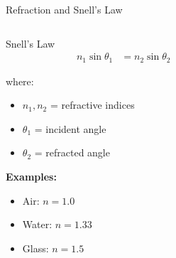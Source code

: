 \begin{frame}{Refraction and Snell's Law}
    \begin{columns}
        \begin{column}{0.5\textwidth}
            \begin{mathbox}{Snell's Law}
                \begin{align}
                    n_1 \sin\theta_1 &= n_2 \sin\theta_2
                \end{align}
                
                where:
                \begin{itemize}
                    \item $n_1, n_2$ = refractive indices
                    \item $\theta_1$ = incident angle
                    \item $\theta_2$ = refracted angle
                \end{itemize}
                
                \vspace{0.3cm}
                \textbf{Examples:}
                \begin{itemize}
                    \item Air: $n = 1.0$
                    \item Water: $n = 1.33$
                    \item Glass: $n = 1.5$
                \end{itemize}
            \end{mathbox}
        \end{column}
        \begin{column}{0.5\textwidth}
\end{column}
\end{columns}
\end{frame}
